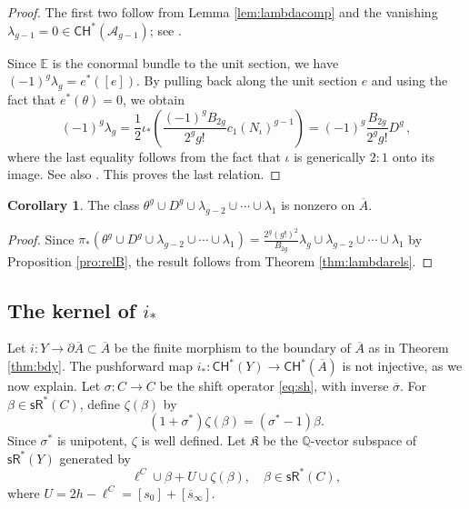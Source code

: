 \documentclass[11pt]{article}
\def\CH{\mathsf{CH}}
\def\QQ{\mathbb{Q}}
\def\sR{\mathsf{sR}}
\newcommand{\barA}{\overline{A}}
\newcommand{\sh}{\sigma}
\newcommand{\shb}{\overline{\sh}}
\theoremstyle{definition}
\newtheorem{corollary}[definition]{Corollary}
\begin{document}
\begin{proof}
    The first two follow from Lemma \ref{lem:lambdacomp} and the vanishing $\lambda_{g-1} =0 \in \CH^*(\mathcal A_{g-1})$; see \cite{vdG99}.

    Since $\mathbb E$ is the conormal bundle to the unit section, we have $(-1)^g\lambda_g = e^*([e])$. By pulling back \cite[Theorem~1.6]{BMP} along the unit section $e$ and using the fact that $e^*(\theta) = 0$, we obtain
    \begin{equation}\label{eq:lambdag}
        (-1)^g\lambda_g
        = \frac{1}{2}\iota_*\left(\frac{(-1)^gB_{2g}}{2^gg!}c_1(N_\iota)^{g-1}\right) = (-1)^g \frac{B_{2g}}{2^gg!}D^g\,,
    \end{equation}
    where the last equality follows from the fact that $\iota$ is generically $2\!:\!1$ onto its image. See also \cite{EvdG05}. This proves the last relation.
\end{proof}

\begin{corollary}\label{cor:non-zero}
    The class $\theta^g\cup D^g\cup \lambda_{g-2}\cup \cdots\cup \lambda_{1}$ is nonzero on $\barA$.
\end{corollary}
\begin{proof}
    Since $\pi_*(\theta^g\cup D^g\cup \lambda_{g-2}\cup \cdots\cup \lambda_{1}) = \frac{2^g(g!)^2}{B_{2g}}\lambda_g\cup\lambda_{g-2}\cup\cdots\cup \lambda_1$ by Proposition \ref{pro:relB}, the result follows from Theorem \ref{thm:lambdarels}.
\end{proof}


\subsection{The kernel of \texorpdfstring{$i_*$}{i}}

Let $i : Y \to \partial \barA \subset \barA$ be the finite morphism to the boundary of $\barA$ as in Theorem \ref{thm:bdy}. The pushforward map $i_* : \CH^*(Y) \to \CH^*(\barA)$ is not injective, as we now explain. Let $\sh : C \to C$ be the shift operator \eqref{eq:sh}, with inverse $\shb$. For $\beta \in \sR^*(C)$, define $\zeta(\beta)$ by
\begin{equation}\label{eq:zeta}
    (1+\sh^*)\zeta(\beta) = (\sh^*-1)\beta .
\end{equation}
Since $\sh^*$ is unipotent, $\zeta$ is well defined. Let $\mathfrak K$ be the $\QQ$-vector subspace of $\sR^*(Y)$ generated by
\[
\ell^C\cup\beta + U\cup\zeta(\beta),
\quad
\beta \in \sR^*(C),
\]
where $U = 2h-\ell^C =[s_0] + [\overline{s}_\infty]$.
\end{document}
